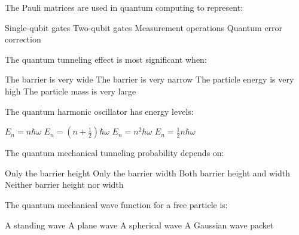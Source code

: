 \begin{question}[2]
The Pauli matrices are used in quantum computing to represent:

\begin{oneparcheckboxes}
\correctchoice Single-qubit gates
\choice Two-qubit gates
\choice Measurement operations
\choice Quantum error correction
\end{oneparcheckboxes}
\end{question}

\begin{question}[2]
The quantum tunneling effect is most significant when:

\begin{oneparcheckboxes}
\choice The barrier is very wide
\correctchoice The barrier is very narrow
\choice The particle energy is very high
\choice The particle mass is very large
\end{oneparcheckboxes}
\end{question}

\begin{question}[2]
The quantum harmonic oscillator has energy levels:

\begin{oneparcheckboxes}
\choice $\displaystyle E_n = n\hbar\omega$
\correctchoice $\displaystyle E_n = (n + \frac{1}{2})\hbar\omega$
\choice $\displaystyle E_n = n^2\hbar\omega$
\choice $\displaystyle E_n = \frac{1}{2}n\hbar\omega$
\end{oneparcheckboxes}
\end{question}

\begin{question}[2]
The quantum mechanical tunneling probability depends on:

\begin{oneparcheckboxes}
\choice Only the barrier height
\choice Only the barrier width
\correctchoice Both barrier height and width
\choice Neither barrier height nor width
\end{oneparcheckboxes}
\end{question}

\begin{question}[2]
The quantum mechanical wave function for a free particle is:

\begin{oneparcheckboxes}
\choice A standing wave
\correctchoice A plane wave
\choice A spherical wave
\choice A Gaussian wave packet
\end{oneparcheckboxes}
\end{question}

